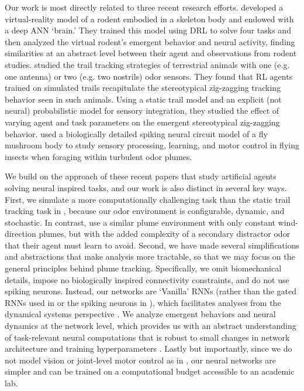 \documentclass[5p,twocolumn,authoryear]{elsarticle}
\begin{document}
Our work is most directly related to three recent research efforts.
\cite{merel2019deep} developed a virtual-reality model of a rodent embodied in a skeleton body and endowed with a deep ANN `brain.' 
They trained this model using DRL to solve four tasks and then analyzed the virtual rodent's emergent behavior and neural activity, finding similarities at an abstract level between their agent and observations from rodent studies. 
\cite{reddy2021sector} studied the trail tracking strategies of terrestrial animals with one (e.g. one antenna) or two (e.g. two nostrils) odor sensors. 
They found that RL agents trained on simulated trails recapitulate the stereotypical zig-zagging tracking behavior seen in such animals. 
Using a static trail model and an explicit (not neural) probabilistic model for sensory integration, they studied the effect of varying agent and task parameters on the emergent stereotypical zig-zagging behavior.     
\cite{rapp2020spiking} used a biologically detailed spiking neural circuit model of a fly mushroom body to study sensory processing, learning, and motor control in flying insects when foraging within turbulent odor plumes. 

We build on the approach of these recent papers that study artificial agents solving neural inspired tasks, and our work is also distinct in several key ways. 
First, we simulate a more computationally challenging task than the static trail tracking task in \citep{reddy2021sector}, because our odor environment is configurable, dynamic, and stochastic.
In contrast, \cite{rapp2020spiking} use a similar plume environment with only constant wind-direction plumes, but with the added complexity of a secondary distractor odor that their agent must learn to avoid.
Second, we have made several simplifications and abstractions that make analysis more tractable, so that we may focus on the general principles behind plume tracking.
Specifically, we omit biomechanical details, impose no biologically inspired connectivity constraints, and do not use spiking neurons.
Instead, our networks are `Vanilla' RNNs (rather than the gated RNNs used in \cite{merel2019deep} or the spiking neurons in \cite{rapp2020spiking}), which facilitates analyses from the dynamical systems perspective \citep{rajan2006eigenvalue,sussillo2013opening,maheswaranathan2019reverse,maheswaranathan2019universality,vyas2020computation}.
We analyze emergent behaviors and neural dynamics at the network level, which provides us with an abstract understanding of task-relevant neural computations that is robust to small changes in network architecture and training hyperparameters \citep{vyas2020computation, maheswaranathan2019universality, sussillo2013opening}.
Lastly but importantly, since we do not model vision or joint-level motor control as in \cite{merel2019deep}, our neural networks are simpler and can be trained on a computational budget accessible to an academic lab. 
\end{document}
